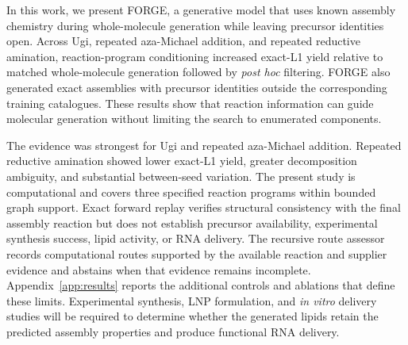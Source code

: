 \documentclass{article}
\begin{document}
In this work, we present FORGE, a generative model that uses known assembly chemistry during whole-molecule generation while leaving precursor identities open. Across Ugi, repeated aza-Michael addition, and repeated reductive amination, reaction-program conditioning increased exact-L1 yield relative to matched whole-molecule generation followed by \textit{post hoc} filtering. FORGE also generated exact assemblies with precursor identities outside the corresponding training catalogues. These results show that reaction information can guide molecular generation without limiting the search to enumerated components.

The evidence was strongest for Ugi and repeated aza-Michael addition. Repeated reductive amination showed lower exact-L1 yield, greater decomposition ambiguity, and substantial between-seed variation. The present study is computational and covers three specified reaction programs within bounded graph support. Exact forward replay verifies structural consistency with the final assembly reaction but does not establish precursor availability, experimental synthesis success, lipid activity, or RNA delivery. The recursive route assessor records computational routes supported by the available reaction and supplier evidence and abstains when that evidence remains incomplete. Appendix~\ref{app:results} reports the additional controls and ablations that define these limits. Experimental synthesis, LNP formulation, and \textit{in vitro} delivery studies will be required to determine whether the generated lipids retain the predicted assembly properties and produce functional RNA delivery.
\end{document}
